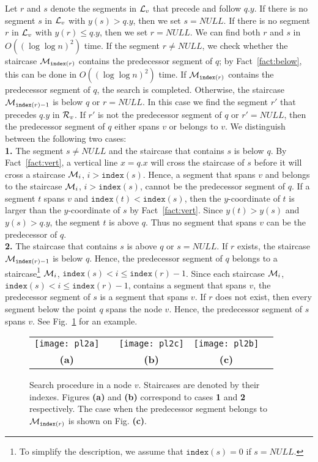 \documentclass[10pt]{llncs}
\def\idtt#1{\ensuremath{\mathtt{#1}}}
\newcommand{\cL}{{\cal L}}
\newcommand{\cR}{{\cal R}}
\newcommand{\cM}{{\cal M}}
\newcommand{\sindex}{\idtt{index}}
\begin{document}
Let $r$ and $s$ denote the segments in $\cL_v$ that precede and 
follow $q.y$.
If there is no segment $s$ in $\cL_v$ with $y(s)>q.y$, then 
we set $s=NULL$. 
If there is no segment $r$ in $\cL_v$ with $y(r)\leq q.y$, then 
we set $r=NULL$. 
We can find both $r$ and $s$ in $O((\log \log n)^2)$ time. 
If the segment $r\not= NULL$, we check whether the staircase  
$\cM_{\sindex(r)}$ contains the predecessor segment of $q$; by Fact~\ref{fact:below}, 
this can be done in $O((\log\log n)^2)$ time. 
If $\cM_{\sindex(r)}$ contains the predecessor segment of $q$, 
the search is completed. 
Otherwise, the staircase $\cM_{\sindex(r)-1}$ is below $q$ or 
$r=NULL$. 
In this case we find the segment $r'$ that precedes $q.y$ in $\cR_v$. 
If $r'$ is not the predecessor segment of $q$ or $r'=NULL$, 
then the predecessor segment of $q$ either spans $v$ or belongs to $v$. 
We distinguish between the following two cases:\\ 
{\bf 1.} The segment $s\not=NULL$  and the staircase that contains $s$ is
 below $q$. By Fact~\ref{fact:vert}, a vertical line 
$x=q.x$ will cross the staircase of $s$ before it will cross 
a staircase $\cM_i$, $i> \sindex(s)$. Hence, a segment that spans $v$ and 
belongs to the staircase $\cM_i$, $i> \sindex(s)$, cannot 
be the predecessor segment of $q$. If a segment $t$ spans $v$ and 
$\sindex(t) < \sindex(s)$, then the $y$-coordinate of $t$ is larger than the 
$y$-coordinate of $s$ by Fact~\ref{fact:vert}. Since $y(t)> y(s)$ and 
$y(s)> q.y$,
the segment $t$ is above $q$. 
Thus no segment that spans $v$ can be the predecessor 
of $q$. \\
{\bf 2.} The staircase that contains $s$ is above $q$ or $s=NULL$. 
If $r$ exists, the staircase 
 $\cM_{\sindex(r)-1}$ is below $q$. Hence, the predecessor segment of $q$ 
belongs  to a staircase\footnote{To simplify the description,
 we assume that $\sindex(s)=0$ if $s=NULL$.} 
$\cM_i$, $\sindex(s) < i \leq \sindex(r)-1$.
Since each staircase $\cM_i$, $\sindex(s) < i \leq \sindex(r)-1$, 
 contains a segment that spans $v$, the predecessor segment of $s$ is 
a segment that spans $v$. 
If $r$ does not exist, then every segment below the point $q$ spans 
the node $v$. Hence, the predecessor segment of $s$ spans $v$.
See Fig.~\ref{fig:pl} for an example.

\begin{figure}[tb]
  \centering
  \begin{tabular}{ccccc}
  \texttt{[image: pl2a]} & \hspace*{.2cm} &
  \texttt{[image: pl2c]} & \hspace*{.2cm} 
  \texttt{[image: pl2b]}  \\
  {\bf (a)}   &  & {\bf(b)} &  {\bf (c)} \\
  \end{tabular}
  \caption{Search procedure in a node $v$. 
    Staircases are denoted by their indexes. 
    Figures {\bf (a)} and  {\bf (b)} correspond to cases {\bf 1} and {\bf 2} 
    respectively. The case when the predecessor segment belongs to 
    $\cM_{\sindex(r)}$ is shown on Fig. {\bf (c)}.
     }
  \label{fig:pl}
\end{figure} 
\end{document}

